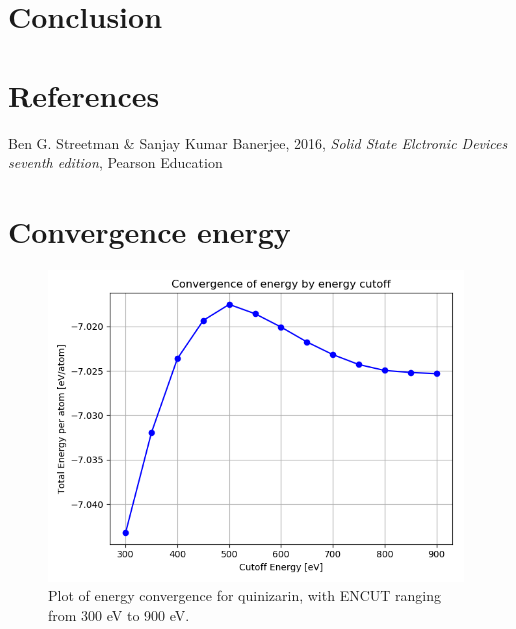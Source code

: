 \documentclass{article}
\begin{document}
\vspace{1cm}

\section{Conclusion}    \label{sec:Conclusion}


\vspace{1cm}

\section{References} \label{sec:References}

    \begin{thebibliography}{}

    Ben G. Streetman \& Sanjay Kumar Banerjee, 2016, \textit{Solid State Elctronic Devices seventh edition}, Pearson Education


    \end{thebibliography}



\appendix

\section{Convergence energy}

  \begin{figure}[H]
      \centering
      \includegraphics[width = 11cm]{../fig/convergence_energy.png}
      \caption{Plot of energy convergence for quinizarin, with ENCUT ranging from 300 eV to 900 eV. }
      \label{fig:convergence_energy.png}
  \end{figure}
\end{document}
